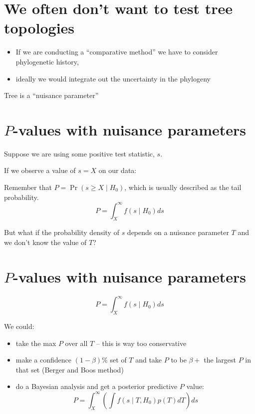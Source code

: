 
% 

\myNewSlide
\section*{We often don't want to test tree topologies}
\begin{itemize}
    \item If we are conducting a ``comparative method'' we have to consider phylogenetic history,
    \item ideally we would integrate out the uncertainty in the phylogeny
\end{itemize}

Tree is a  ``nuisance parameter''

\myNewSlide
\section*{$P$-values with nuisance parameters}
Suppose we are using some positive test statistic, $s$.

If we observe a value of $s=X$ on our data:

Remember that $P = \Pr(s \geq X \mid H_0)$, which
is usually described as the tail probability.
$$P = \int_X^\infty f(s\mid H_0) ds$$

But what if the probability density of $s$ depends on a nuisance
parameter $T$ and we don't know the value of $T$?

\myNewSlide
\section*{$P$-values with nuisance parameters}
$$P = \int_X^\infty f(s\mid H_0) ds$$

We could:
\begin{itemize}
    \item  take the max $P$ over all $T$ -- this is way too conservative
    \item make a confidence $(1-\beta)\%$ set of $T$ and take  $P$ to be $\beta +$ the largest $P$ in that set (Berger and Boos method)
    \item do a Bayesian analysis and get a posterior predictive $P$ value:
    $$ P = \int_X^\infty \left(\int f(s\mid T, H_0)p(T) dT \right)ds $$
\end{itemize}
